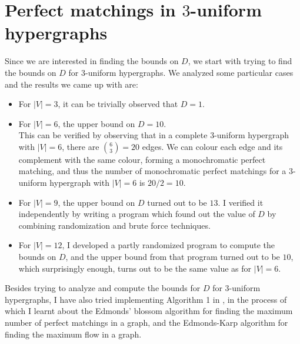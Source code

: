 \documentclass[11pt]{article}
\begin{document}
\section*{Perfect matchings in $3$-uniform hypergraphs}
Since we are interested in finding the bounds on $D$, we start with trying to find the bounds on $D$ for $3$-uniform hypergraphs. We analyzed some particular cases and the results we came up with are:
\begin{itemize}
    \item For $|V|=3$, it can be trivially observed that $D=1$.
    \item For $|V|=6$, the upper bound on $D=10$. \\
    This can be verified by observing that in a complete $3$-uniform hypergraph with $|V|=6$, there are $\displaystyle\binom{6}{3}=20$ edges. We can colour each edge and its complement with the same colour, forming a monochromatic perfect matching, and thus the number of monochromatic perfect matchings for a $3$-uniform hypergraph with $|V|=6$ is $20/2=10$.
    \item For $|V|=9$, the upper bound on $D$ turned out to be $13$. I verified it independently by writing a program which found out the value of $D$ by combining randomization and brute force techniques. 
    \item For $|V|=12$, I developed a partly randomized program to compute the bounds on $D$, and the upper bound from that program turned out to be $10$, which surprisingly enough, turns out to be the same value as for $|V|=6$.
\end{itemize}

\vspace{1cm}
Besides trying to analyze and compute the bounds for $D$ for $3$-uniform hypergraphs, I have also tried implementing Algorithm 1 in \cite{chandran2022perfect}, in the process of which I learnt about the Edmonds' blossom algorithm for finding the maximum number of perfect matchings in a  graph, and the Edmonds-Karp algorithm for finding the maximum flow in a  graph.




\end{document}

